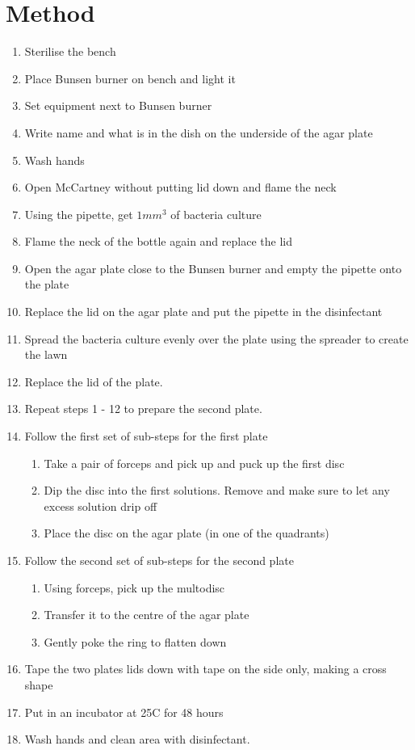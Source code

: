 \documentclass{thomasClass}
\begin{document}
\section{Method}
\begin{enumerate}
    \item Sterilise the bench
    \item Place Bunsen burner on bench and light it
    \item Set equipment next to Bunsen burner
    \item Write name and what is in the dish on the underside of the agar plate
    \item Wash hands
    \item Open McCartney without putting lid down and flame the neck
    \item Using the pipette, get $1mm^3$ of bacteria culture
    \item Flame the neck of the bottle again and replace the lid
    \item Open the agar plate close to the Bunsen burner and empty the pipette onto the plate
    \item Replace the lid on the agar plate and put the pipette in the disinfectant
    \item Spread the bacteria culture evenly over the plate using the spreader to create the lawn
    \item Replace the lid of the plate.
    \item Repeat steps 1 - 12 to prepare the second plate.
    \item Follow the first set of sub-steps for the first plate
    \begin{enumerate}
        \item Take a pair of forceps and pick up and puck up the first disc
        \item Dip the disc into the first solutions. Remove and make sure to let any excess solution drip off
        \item Place the disc on the agar plate (in one of the quadrants)
    \end{enumerate}
    \item Follow the second set of sub-steps for the second plate
    \begin{enumerate}
        \item Using forceps, pick up the multodisc
        \item Transfer it to the centre of the agar plate
        \item Gently poke the ring to flatten down
    \end{enumerate}
    \item Tape the two plates lids down with tape on the side only, making a cross shape
    \item Put in an incubator at 25\textdegree C for 48 hours
    \item Wash hands and clean area with disinfectant.
\end{enumerate}
\end{document}
